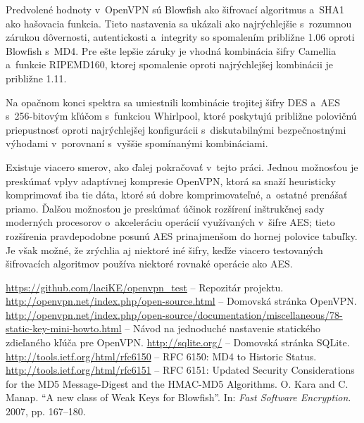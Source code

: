 \documentclass[12pt,a4paper]{article}
\begin{document}
Predvolené hodnoty v~OpenVPN sú Blowfish ako šifrovací algoritmus a~SHA1
ako hašovacia funkcia. Tieto nastavenia sa ukázali ako najrýchlejšie
s~rozumnou zárukou dôvernosti, autentickosti a~integrity so spomalením
približne 1.06 oproti Blowfish s~MD4. Pre ešte lepšie záruky je vhodná
kombinácia šifry Camellia a~funkcie RIPEMD160, ktorej spomalenie oproti
najrýchlejšej kombinácii je približne 1.11.

Na opačnom konci spektra sa umiestnili kombinácie trojitej šifry DES a~AES
s~256-bitovým kľúčom s~funkciou Whirlpool, ktoré poskytujú približne
polovičnú priepustnosť oproti najrýchlejšej konfigurácii s~diskutabilnými
bezpečnostnými výhodami v~porovnaní s~vyššie spomínanými kombináciami.

Existuje viacero smerov, ako ďalej pokračovať v~tejto práci. Jednou
možnosťou je pre\-skú\-mať vplyv adaptívnej kompresie OpenVPN, ktorá sa snaží
heuristicky komprimovať iba tie dáta, ktoré sú dobre komprimovateľné,
a~ostatné prenášať priamo. Ďalšou možnosťou je preskúmať účinok rozšírení
inštrukčnej sady moderných procesorov o~akceleráciu operácií využívaných
v~šifre AES; tieto rozšírenia pravdepodobne posunú AES prinajmenšom do
hornej polovice tabuľky. Je však možné, že zrýchlia aj niektoré iné šifry,
keďže viacero testovaných šifrovacích algoritmov používa niektoré rovnaké
operácie ako AES.

\renewcommand{\refname}{Literatúra}
{}
\begin{thebibliography}{99}
   \url{https://github.com/laciKE/openvpn_test} -- Repozitár projektu.
   \url{http://openvpn.net/index.php/open-source.html} -- Domovská stránka OpenVPN.
   \url{http://openvpn.net/index.php/open-source/documentation/miscellaneous/78-static-key-mini-howto.html} -- Návod na jednoduché nastavenie statického zdieľaného kľúča pre OpenVPN.
   \url{http://sqlite.org/} -- Domovská stránka SQLite.
   \url{http://tools.ietf.org/html/rfc6150} -- RFC 6150: MD4 to Historic Status.
   \url{http://tools.ietf.org/html/rfc6151} -- RFC 6151: Updated Security Considerations for the MD5 Message-Digest and the HMAC-MD5 Algorithms.
   O. Kara and C. Manap. ``A new class of Weak Keys for Blowfish''. In: \emph{Fast Software Encryption}. 2007, pp. 167--180.
\end{thebibliography}
\end{document}
